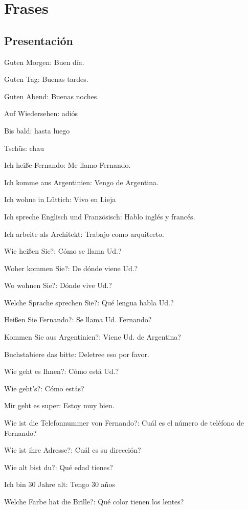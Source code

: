 \chapter{Frases}

\section{Presentación}
\begin{myitemize}
\item Guten Morgen: Buen día.
\item Guten Tag: Buenas tardes.
\item Guten Abend: Buenas noches.
\item Auf Wiedersehen: adiós
\item Bis bald: hasta luego
\item Tschüs: chau
\item Ich heiße Fernando: Me llamo Fernando.
\item Ich komme aus Argentinien: Vengo de Argentina.
\item Ich wohne in Lüttich: Vivo en Lieja
\item Ich spreche Englisch und Französisch: Hablo inglés y francés.
\item Ich arbeite als Architekt: Trabajo como arquitecto.
\item Wie heißen Sie?: Cómo se llama Ud.?
\item Woher kommen Sie?: De dónde viene Ud.?
\item Wo wohnen Sie?: Dónde vive Ud.?
\item Welche Sprache sprechen Sie?: Qué lengua habla Ud.?
\item Heißen Sie Fernando?: Se llama Ud. Fernando?
\item Kommen Sie aus Argentinien?: Viene Ud. de Argentina?
\item Buchstabiere das bitte: Deletree eso por favor.
\item Wie geht es Ihnen?: Cómo está Ud.?
\item Wie geht's?: Cómo estás?
\item Mir geht es super: Estoy muy bien.
\item Wie ist die Telefonnummer von Fernando?: Cuál es el número de teléfono de Fernando?
\item Wie ist ihre Adresse?: Cuál es su dirección?
\item Wie alt bist du?: Qué edad tienes?
\item Ich bin 30 Jahre alt: Tengo 30 años
\item Welche Farbe hat die Brille?: Qué color tienen los lentes?

\end{myitemize}
